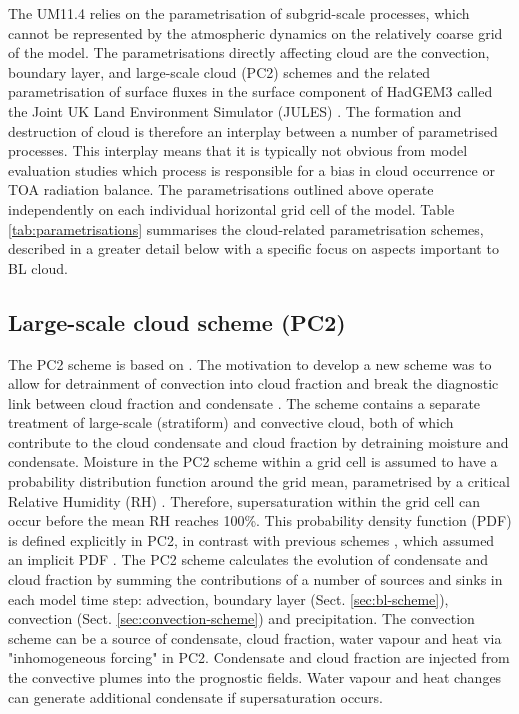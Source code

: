 The UM11.4 relies on the parametrisation of subgrid-scale
processes,
which cannot be represented by the atmospheric dynamics on the relatively
coarse grid of the model. The parametrisations directly affecting cloud
are the convection, boundary layer, and large-scale cloud (PC2) schemes
and the related parametrisation of surface fluxes in the surface component of
HadGEM3 called the Joint UK Land Environment Simulator (JULES) \citep{best2011,clark2011}. The formation
and destruction of cloud is therefore an interplay between a number
of parametrised processes. This interplay means that it is typically not obvious from model
evaluation studies which process is responsible for a bias in cloud occurrence
or TOA radiation balance. The parametrisations outlined above operate independently
on each individual horizontal grid cell of the model.
Table \ref{tab:parametrisations} summarises the cloud-related
parametrisation schemes, described in a greater detail below with a specific
focus on aspects important to BL cloud.

\subsection{Large-scale cloud scheme (PC2)}

The PC2 scheme is based on \cite{tiedtke1993}. The motivation to
develop a new scheme was to allow for detrainment of convection into cloud
fraction and break the diagnostic link between cloud fraction and condensate
\citep{umdp030}. The scheme contains a separate treatment of large-scale (stratiform) and
convective cloud, both of which contribute to the cloud condensate and cloud
fraction by detraining moisture and condensate. Moisture in the PC2 scheme
within a grid cell is assumed to have a probability distribution function around
the grid mean, parametrised by a critical Relative Humidity (RH) \citep{gregory2002}.
Therefore, supersaturation within the grid cell can occur before the mean
RH reaches 100\%. This probability density function (PDF) is defined explicitly in PC2, in
contrast with previous schemes \citep{tiedtke1993}, which assumed an implicit
PDF \citep{wilson2008a}.
The PC2 scheme calculates the evolution of condensate and cloud fraction by summing the
contributions of a number of sources and sinks in each model time step:
advection,  boundary layer (Sect. \ref{sec:bl-scheme}),
convection (Sect. \ref{sec:convection-scheme}) and precipitation.
The convection scheme can be a
source of condensate, cloud fraction, water vapour and heat via "inhomogeneous
forcing" in PC2. Condensate and cloud fraction are injected from the convective
plumes into the prognostic fields. Water vapour and heat changes can generate additional
condensate if supersaturation occurs.

